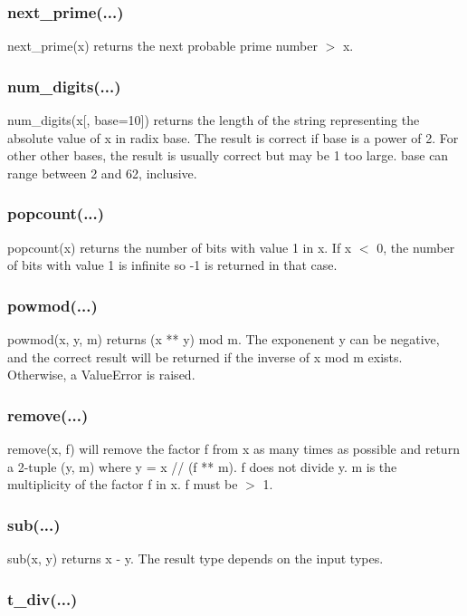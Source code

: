 \subsubsection{next\_prime(...)}

next\_prime(x) returns the next probable prime number $>$ x.

\subsubsection{num\_digits(...)}

num\_digits(x[, base=10]) returns the length of the string representing the absolute value of x in
radix base. The result is correct if base is a power of 2. For other other bases, the result is
usually correct but may be 1 too large. base can range between 2 and 62, inclusive.

\subsubsection{popcount(...)}

popcount(x) returns the number of bits with value 1 in x. If x $<$ 0, the number of bits with value 1
is infinite so -1 is returned in that case.

\subsubsection{powmod(...)}

powmod(x, y, m) returns (x ** y) mod m. The exponenent y can be negative, and the correct
result will be returned if the inverse of x mod m exists. Otherwise, a ValueError is raised.

\subsubsection{remove(...)}

remove(x, f) will remove the factor f from x as many times as possible and return a 2-tuple (y,
m) where y = x // (f ** m). f does not divide y. m is the multiplicity of the factor f in x. f must be $>$ 1.

\subsubsection{sub(...)}

sub(x, y) returns x - y. The result type depends on the input types.

\subsubsection{t\_div(...)}

